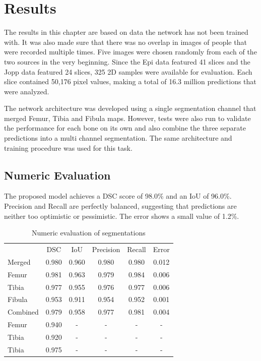 \section{Results}

The results in this chapter are based on data the network has not been trained with. It was also made sure that there was no overlap in images of people that were recorded multiple times. Five images were chosen randomly from each of the two sources in the very beginning. Since the Epi data featured 41 slices and the Jopp data featured 24 slices, 325 2D samples were available for evaluation. Each slice contained 50,176 pixel values, making a total of 16.3 million predictions that were analyzed.

The network architecture was developed using a single segmentation channel that merged Femur, Tibia and Fibula maps. However, tests were also run to validate the performance for each bone on its own and also combine the three separate predictions into a multi channel segmentation. The same architecture and training procedure was used for this task.

\subsection{Numeric Evaluation}

The proposed model achieves a DSC score of 98.0\% and an IoU of 96.0\%. Precision and Recall are perfectly balanced, suggesting that predictions are neither too optimistic or pessimistic. The error shows a small value of 1.2\%.

\begin{table}[H]
    \centering
    \begin{tabular}{| l | c | c | c | c | c |}
    \hline
           & DSC & IoU & Precision & Recall & Error \\ 
    \Xhline{3\arrayrulewidth}
    Merged & 0.980 & 0.960 & 0.980 & 0.980 & 0.012 \\
    \hline
    Femur & 0.981 & 0.963 & 0.979 & 0.984 & 0.006 \\
    \hline
    Tibia & 0.977 & 0.955 & 0.976 & 0.977 & 0.006 \\
    \hline
    Fibula & 0.953 & 0.911 & 0.954 & 0.952 & 0.001 \\
    \hline
    Combined & 0.979 & 0.958 & 0.977 & 0.981 & 0.004 \\
    \Xhline{3\arrayrulewidth}
    Femur \cite{Dodin2011} & 0.940 & - & - & - & - \\
    \hline
    Tibia \cite{Dodin2011} & 0.920 & - & - & - & - \\
    \hline
    Tibia \cite{Dam} & 0.975 & - & - & - & - \\
    \hline
    \end{tabular}
    \caption{Numeric evaluation of segmentations}
\end{table}

